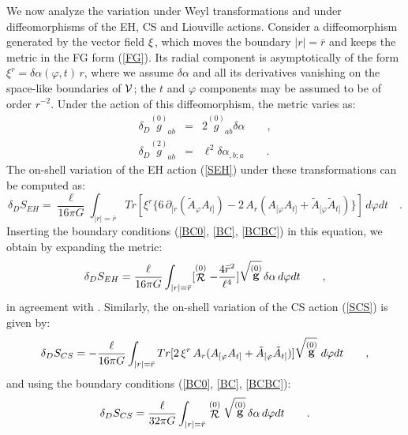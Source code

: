 \documentclass[a4paper,10pt]{article}
\begin{document}
We now analyze the variation under Weyl transformations and under
diffeomorphisms of the EH, CS and Liouville actions. 
Consider a diffeomorphism generated by the vector field
$\bf \xi$, which moves the boundary $|r|=\bar r$
and keeps the metric in 
the FG form (\ref{FG}). Its radial component is asymptotically of the form
${\xi^r}= \delta \alpha(\varphi, t) \, r$, where we assume
$\delta \alpha$
and all its derivatives vanishing on the space-like  boundaries of 
$\cal V$; the $t$ and $\varphi$ components may be assumed to be of order $r^{-2}$\cite{ISTY,BERS}.  
Under the action of this  
diffeomorphism, the metric varies as:
\begin{eqnarray}
\label{difG}
\delta _{D}\stackrel {(0)} g_{ab} &=&  2 \stackrel {(0)} g_{ab} 
\delta \alpha \qquad , \\
\delta _{D}\stackrel {(2)} g_{ab} &=&  \ell^2
\delta \alpha_{,b;a} \qquad .
\end{eqnarray}
The on-shell variation of the EH action (\ref{SEH})
under these transformations can be computed as:
\begin{equation}
\delta_{D} S_{EH} =
\frac  \ell {16 \pi G} 
\int_{|r|=\bar r} Tr [ \xi^r \{ 6 \,\partial_{[r} (\tilde A_\varphi A_{t]}) - 
 2 \, A_r (A_{[\varphi}  A_{t]} + \tilde A_{[\varphi} \tilde A_{t]})\} ]
\, d\varphi dt
\quad .
\end{equation}
Inserting the boundary conditions (\ref{BC0}, \ref{BC}, \ref{BCBC}) in
this equation, we obtain by expanding the metric:
\begin{equation}
\label{dDSEH}
\delta_{D} S_{EH} =
 \frac \ell {16 \pi G}
\int_{|r|=\bar r} [\stackrel {(0)} {\cal R}- \frac {4 \bar  r^2}{\ell^4}]
 \sqrt{\stackrel {(0)} {\bf g}} \, \delta \alpha
 \, d\varphi dt
\qquad ,
\end{equation}
in agreement with \cite{HS, B, BERS}. Similarly, 
the on-shell variation of the CS action (\ref{SCS}) is given by:
\begin{equation}
\delta_{D} S_{CS} =
- \frac  \ell {16 \pi G} 
\int_{|r|=\bar r} Tr [2\,  \xi^r \, A_r (A_{[\varphi}  A_{t]} + 
\tilde A_{[\varphi} \tilde A_{t]}) ]
\sqrt{\stackrel {(0)} {\bf g}}\,
 \, d\varphi dt \qquad ,
\end{equation}
and using the boundary conditions (\ref{BC0}, \ref{BC}, \ref{BCBC}):
\begin{equation}
\delta_{D} S_{CS} = 
 \frac \ell {32 \pi G}
\int_{|r|=\bar r} \stackrel {(0)} {\cal R}
 \sqrt{\stackrel {(0)} {\bf g}} \, \delta \alpha
 \, d\varphi dt
\qquad .
\end{equation}
\end{document}
